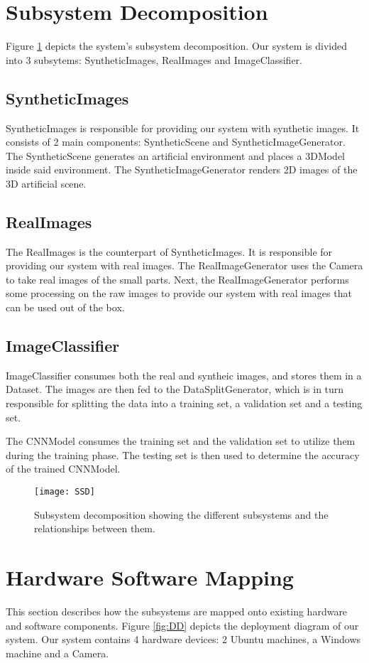 \section{Subsystem Decomposition}

Figure \ref{fig:SSD} depicts the system's subsystem decomposition. Our system is divided into 3 subsytems: SyntheticImages, RealImages and ImageClassifier.

\subsection{SyntheticImages}
SyntheticImages is responsible for providing our system with synthetic images. It consists of 2 main components: SyntheticScene and SyntheticImageGenerator. The SyntheticScene generates an artificial environment and places a 3DModel inside said environment. The SyntheticImageGenerator renders 2D images of the 3D artificial scene.

\subsection{RealImages}
The RealImages is the counterpart of SyntheticImages. It is responsible for providing our system with real images. The RealImageGenerator uses the Camera to take real images of the small parts. Next, the RealImageGenerator performs some processing on the raw images to provide our system with real images that can be used out of the box.

\subsection{ImageClassifier}
ImageClassifier consumes both the real and syntheic images, and stores them in a Dataset. The images are then fed to the DataSplitGenerator, which is in turn responsible for splitting the data into a training set, a validation set and a testing set.

The CNNModel consumes the training set and the validation set to utilize them during the training phase. The testing set is then used to determine the accuracy of the trained CNNModel.

\begin{figure}[H]
\centering
  \texttt{[image: SSD]}
\caption{Subsystem decomposition showing the different subsystems and the relationships between them.}
\label{fig:SSD}
\end{figure}

\section{Hardware Software Mapping}
This section describes how the subsystems are mapped onto existing hardware and software components. Figure \ref{fig:DD} depicts the deployment diagram of our system. Our system contains 4 hardware devices: 2 Ubuntu machines, a Windows machine and a Camera.

